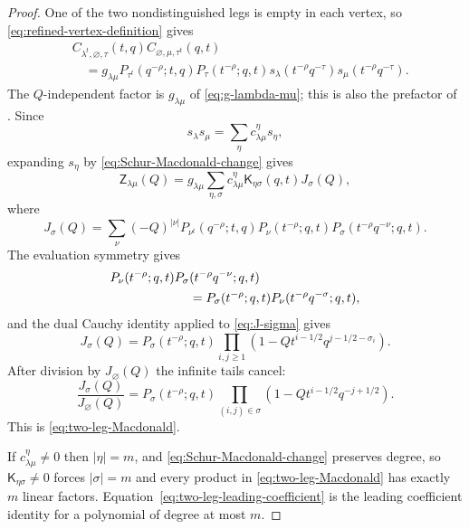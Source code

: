 \documentclass{amsart}
\theoremstyle{definition}
\numberwithin{equation}{section}
\begin{document}
\begin{proof}
One of the two nondistinguished legs is empty in each vertex, so \eqref{eq:refined-vertex-definition} gives
\begin{equation}
\begin{aligned}
 &C_{\lambda^t,\varnothing,\tau}(t,q)
  C_{\varnothing,\mu,\tau^t}(q,t)\\
 &\quad=g_{\lambda\mu}
 P_{\tau^t}(q^{-\rho};t,q)P_\tau(t^{-\rho};q,t)
 s_\lambda(t^{-\rho}q^{-\tau})
 s_\mu(t^{-\rho}q^{-\tau}).
\end{aligned}
\label{eq:two-leg-vertex-contraction}
\end{equation}
The \(Q\)-independent factor is \(g_{\lambda\mu}\) of \eqref{eq:g-lambda-mu}; this is also the prefactor of \cite[Section~4]{IqbalKozcaz}.  Since
\[
 s_\lambda s_\mu
 =\sum_\eta c_{\lambda\mu}^{\eta}s_\eta,
\]
expanding \(s_\eta\) by \eqref{eq:Schur-Macdonald-change} gives
\[
 \mathsf Z_{\lambda\mu}(Q)
 =g_{\lambda\mu}\sum_{\eta,\sigma}
 c_{\lambda\mu}^{\eta}\mathsf K_{\eta\sigma}(q,t)
 J_\sigma(Q),
\]
where
\begin{equation}
 J_\sigma(Q)
 =
 \sum_\nu(-Q)^{|\nu|}
 P_{\nu^t}(q^{-\rho};t,q)
 P_\nu(t^{-\rho};q,t)
 P_\sigma(t^{-\rho}q^{-\nu};q,t).
\label{eq:J-sigma}
\end{equation}
The evaluation symmetry \cite[Chapter~VI, Section~6, Example~6]{Macdonald} gives
\[
\begin{aligned}
 &P_\nu(t^{-\rho};q,t)
 P_\sigma(t^{-\rho}q^{-\nu};q,t)\\
 &\hspace{22mm}=
 P_\sigma(t^{-\rho};q,t)
 P_\nu(t^{-\rho}q^{-\sigma};q,t),
\end{aligned}
\]
and the dual Cauchy identity applied to \eqref{eq:J-sigma} gives
\[
 J_\sigma(Q)
 =
 P_\sigma(t^{-\rho};q,t)
 \prod_{i,j\geq1}
 \left(1-Qt^{i-1/2}q^{j-1/2-\sigma_i}\right).
\]
After division by \(J_\varnothing(Q)\) the infinite tails cancel:
\begin{equation}
 \frac{J_\sigma(Q)}{J_\varnothing(Q)}
 =
 P_\sigma(t^{-\rho};q,t)
 \prod_{(i,j)\in\sigma}
 \left(1-Qt^{i-1/2}q^{-j+1/2}\right).
\label{eq:J-ratio}
\end{equation}
This is \eqref{eq:two-leg-Macdonald}.

If \(c_{\lambda\mu}^{\eta}\neq0\) then \(|\eta|=m\), and \eqref{eq:Schur-Macdonald-change} preserves degree, so \(\mathsf K_{\eta\sigma}\neq0\) forces \(|\sigma|=m\) and every product in \eqref{eq:two-leg-Macdonald} has exactly \(m\) linear factors.  Equation~\eqref{eq:two-leg-leading-coefficient} is the leading coefficient identity for a polynomial of degree at most \(m\).
\end{proof}
\end{document}
